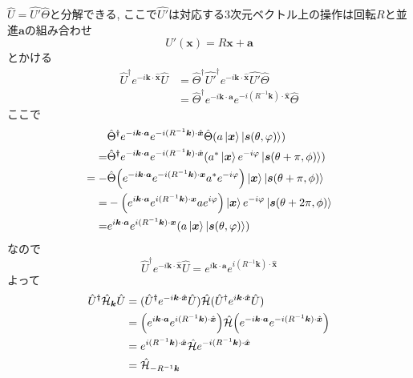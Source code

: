 \begin{theotcolorbox}[title = $\hat{U}$が時間反転操作を含むとき]
    $\hat{U} = \hat{U'} \hat{\Theta}$と分解できる, ここで$\hat{U'}$は対応する3次元ベクトル上の操作は回転$R$と並進$\bm{a}$の組み合わせ
    \begin{equation*}
        U'(\bm{x}) = R\bm{x} + \bm{a}
    \end{equation*}
    とかける
    \begin{align*}
        \hat{U}^{\dagger} e^{-i\bm{k}\cdot \hat{\bm{x}}} \hat{U}  & = \hat{\Theta}^{\dagger} \hat{U'}^{\dagger} e^{-i\bm{k}\cdot \hat{\bm{x}}} \hat{U'} \hat{\Theta}\\
        & = \hat{\Theta}^{\dagger} e^{-i\bm{k}\cdot \bm{a}} e^{-i (R^{-1}\bm{k}) \cdot \hat{\bm{x}}} \hat{\Theta}
    \end{align*}
    ここで
    \begin{align*}
        & \hat{\Theta}^{\dagger} e^{-i\bm{k}\cdot \bm{a}} e^{-i (R^{-1}\bm{k}) \cdot \hat{\bm{x}}} \hat{\Theta} (a\ket{\bm{x}} \ket{\bm{s}(\theta, \varphi)})\\
        = & \hat{\Theta}^{\dagger} e^{-i\bm{k}\cdot \bm{a}} e^{-i (R^{-1}\bm{k}) \cdot \hat{\bm{x}}} (a^{\ast} \ket{\bm{x}} e^{-i\varphi} \ket{\bm{s}(\theta + \pi , \phi)})\\
        = - & \hat{\Theta} \qty( e^{-i\bm{k}\cdot \bm{a}} e^{-i (R^{-1}\bm{k}) \cdot \bm{x}} a^{\ast} e^{-i\varphi}) \ket{\bm{x}} \ket{\bm{s}(\theta + \pi , \phi)}\\
        = & - \qty( e^{i\bm{k}\cdot \bm{a}} e^{i (R^{-1}\bm{k}) \cdot \bm{x}} a e^{i\varphi}) \ket{\bm{x}} e^{-i\varphi} \ket{\bm{s}(\theta + 2\pi , \phi)}\\
        = & e^{i\bm{k}\cdot \bm{a}} e^{i (R^{-1}\bm{k}) \cdot \bm{x}} (a\ket{\bm{x}} \ket{\bm{s}(\theta, \varphi)})
    \end{align*}
    なので
    \begin{equation*}
        \hat{U}^{\dagger} e^{-i\bm{k}\cdot \hat{\bm{x}}} \hat{U} = e^{i\bm{k}\cdot \bm{a}} e^{i (R^{-1}\bm{k}) \cdot \hat{\bm{x}}}
    \end{equation*}
    よって
    \begin{align*}
        \hat{U}^{\dagger} \hat{\mathcal{H}}_{\bm{k}} \hat{U} & = (\hat{U}^{\dagger} e^{-i\bm{k}\cdot \hat{\bm{x}}} \hat{U}) \hat{\mathcal{H}} (\hat{U}^{\dagger} e^{i\bm{k}\cdot \hat{\bm{x}}} \hat{U})\\
        & = \qty(e^{i\bm{k}\cdot \bm{a}} e^{i (R^{-1}\bm{k}) \cdot \hat{\bm{x}}}) \hat{\mathcal{H}} \qty(e^{-i\bm{k}\cdot \bm{a}} e^{-i (R^{-1}\bm{k}) \cdot \hat{\bm{x}}})\\
        & = e^{i (R^{-1}\bm{k}) \cdot \hat{\bm{x}}} \hat{\mathcal{H}} e^{-i (R^{-1}\bm{k}) \cdot \hat{\bm{x}}}\\
        & = \hat{\mathcal{H}}_{- R^{-1}\bm{k}}
    \end{align*}
\end{theotcolorbox}
